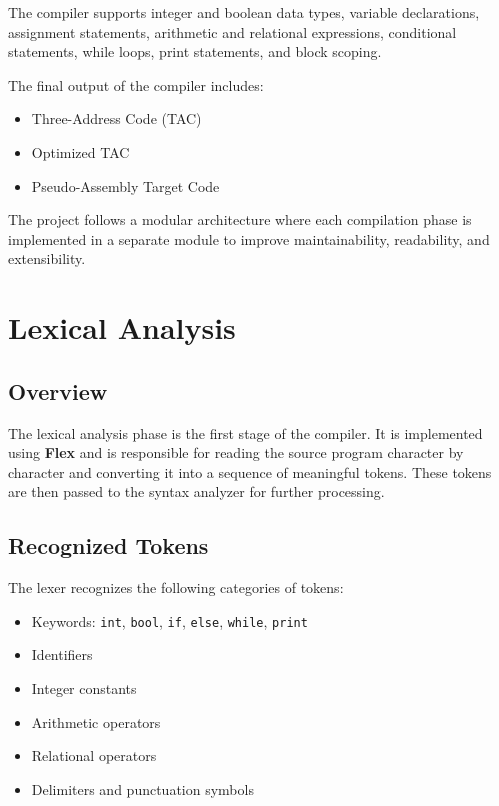 \documentclass[12pt,a4paper]{report}
\begin{document}
The compiler supports integer and boolean data types, variable declarations, assignment statements, arithmetic and relational expressions, conditional statements, while loops, print statements, and block scoping.

The final output of the compiler includes:

\begin{itemize}
    \item Three-Address Code (TAC)
    \item Optimized TAC
    \item Pseudo-Assembly Target Code
\end{itemize}

The project follows a modular architecture where each compilation phase is implemented in a separate module to improve maintainability, readability, and extensibility.



\chapter{Lexical Analysis}

\section{Overview}

The lexical analysis phase is the first stage of the compiler. It is implemented using \textbf{Flex} and is responsible for reading the source program character by character and converting it into a sequence of meaningful tokens. These tokens are then passed to the syntax analyzer for further processing.

\section{Recognized Tokens}

The lexer recognizes the following categories of tokens:

\begin{itemize}
    \item Keywords: \texttt{int}, \texttt{bool}, \texttt{if}, \texttt{else}, \texttt{while}, \texttt{print}
    \item Identifiers
    \item Integer constants
    \item Arithmetic operators
    \item Relational operators
    \item Delimiters and punctuation symbols
\end{itemize}
\end{document}
